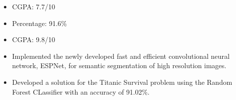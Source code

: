 \documentclass[10pt,a4paper,ragged2e]{altacv}
\begin{document}

\begin{itemize}
\item CGPA: 7.7/10\footnotemark
\end{itemize}

\divider

\begin{itemize}
\item Percentage: 91.6\%
\end{itemize}

\divider

\begin{itemize}
\item CGPA: 9.8/10
\end{itemize}


\begin{itemize}
\item \small Implemented the newly developed fast and efficient convolutional neural network, ESPNet, for semantic segmentation of high resolution images{}.
\end{itemize} \vspace{-3 mm}
\divider\newline\vspace{-1 mm}
\begin{itemize}
    \item \small Developed a solution for the Titanic Survival problem using the Random Forest CLassifier with an accuracy of 91.02\%.
\end{itemize}



\medskip

\end{document}

